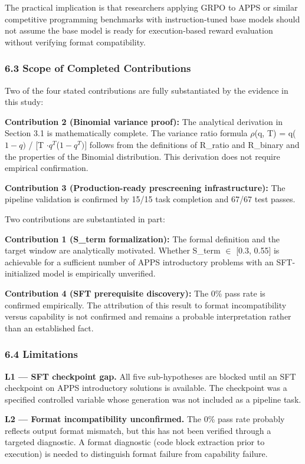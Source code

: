 The practical implication is that researchers applying GRPO to APPS or similar competitive programming benchmarks with instruction-tuned base models should not assume the base model is ready for execution-based reward evaluation without verifying format compatibility.

\subsubsection{6.3 Scope of Completed Contributions}

Two of the four stated contributions are fully substantiated by the evidence in this study:

\textbf{Contribution 2 (Binomial variance proof):} The analytical derivation in Section 3.1 is mathematically complete. The variance ratio formula $\rho$(q, T) = q($1-q)$ / [T $\cdot q^T$($1-q^{T})]$ follows from the definitions of R\_ratio and R\_binary and the properties of the Binomial distribution. This derivation does not require empirical confirmation.

\textbf{Contribution 3 (Production-ready prescreening infrastructure):} The pipeline validation is confirmed by 15/15 task completion and 67/67 test passes.

Two contributions are substantiated in part:

\textbf{Contribution 1 (S\_term formalization):} The formal definition and the target window are analytically motivated. Whether S\_term $\in$ [0.3, 0.55] is achievable for a sufficient number of APPS introductory problems with an SFT-initialized model is empirically unverified.

\textbf{Contribution 4 (SFT prerequisite discovery):} The 0\% pass rate is confirmed empirically. The attribution of this result to format incompatibility versus capability is not confirmed and remains a probable interpretation rather than an established fact.

\subsubsection{6.4 Limitations}

\textbf{L1 --- SFT checkpoint gap.} All five sub-hypotheses are blocked until an SFT checkpoint on APPS introductory solutions is available. The checkpoint was a specified controlled variable whose generation was not included as a pipeline task.

\textbf{L2 --- Format incompatibility unconfirmed.} The 0\% pass rate probably reflects output format mismatch, but this has not been verified through a targeted diagnostic. A format diagnostic (code block extraction prior to execution) is needed to distinguish format failure from capability failure.

